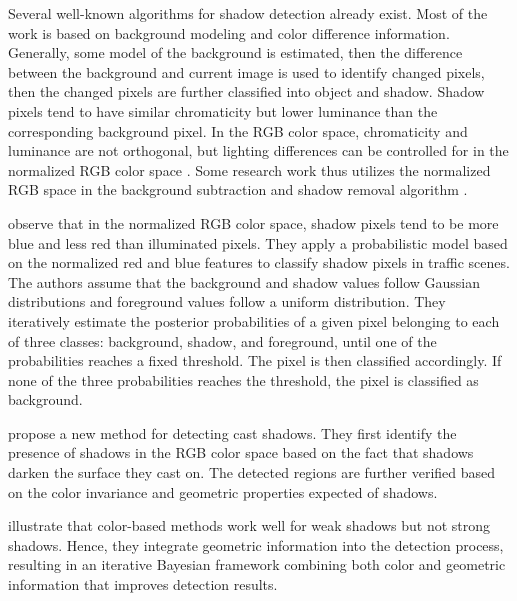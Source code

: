 Several well-known algorithms for shadow detection already exist. Most
of the work is based on background modeling and color difference
information. Generally, some model of the background is estimated,
then the difference between the background and current image is used
to identify changed pixels, then the changed pixels are further
classified into object and shadow.  Shadow pixels tend to have similar
chromaticity but lower luminance than the corresponding background
pixel.  In the RGB color space, chromaticity and luminance are not
orthogonal, but lighting differences can be controlled for in the
normalized RGB color space .  Some
research work thus utilizes the normalized RGB space in the background
subtraction and shadow removal
algorithm .

 observe that in the normalized RGB color
space, shadow pixels tend to be more blue and less red than
illuminated pixels.  They apply a probabilistic model based on the
normalized red and blue features to classify shadow pixels in traffic
scenes. The authors assume that the background and shadow values
follow Gaussian distributions and foreground values follow a uniform
distribution. They iteratively estimate the posterior probabilities of
a given pixel belonging to each of three classes: background, shadow,
and foreground, until one of the probabilities reaches a fixed
threshold. The pixel is then classified accordingly.  If none of the
three probabilities reaches the threshold, the pixel is classified as
background.

 propose a new method for detecting
cast shadows. They first identify the presence of shadows in the RGB
color space based on the fact that shadows darken the surface they
cast on. The detected regions are further verified based on the color
invariance and geometric properties expected of shadows.

 illustrate that color-based methods
work well for weak shadows but not strong shadows. Hence, they
integrate geometric information into the detection process, resulting
in an iterative Bayesian framework combining both color and geometric
information that improves detection results.

